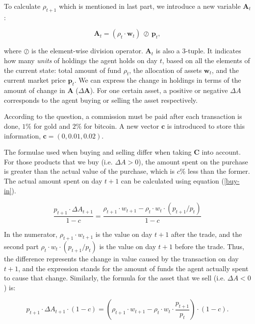 \documentclass{mcmthesis}
\begin{document}
To calculate $\rho _{t+1}$ which is mentioned in last part,
we introduce a new variable $\pmb{A}_t$:

\begin{equation}
  \pmb{A}_t = (\rho _t \cdot \pmb{w}_t) \, \oslash \, \pmb{p}_t ,
\end{equation}

where $\oslash$ is the element-wise division operator.
$\pmb{A}_t$ is also a 3-tuple.
It indicates how many \textit{units} of holdings the agent holds on day $t$,
based on all the elements of the current state:
total amount of fund $\rho_t$, the allocation of assets $\pmb{w}_t$,
and the current market price $\pmb{p}_t$.
We can express the change in holdings in terms of the amount of change in $\pmb{A}$ ($\Delta \pmb{A}$).
For one certain asset,
a positive or negative $\Delta A$ corresponds to the agent buying or selling the asset respectively.

According to the question, a commission must be paid after each transaction is done,
$1\%$ for gold and $2\%$ for bitcoin.
A new vector $\pmb{c}$ is introduced to store this information,
$\pmb{c} = (0, 0.01, 0.02)$.

The formulae used when buying and selling differ when taking $\pmb{C}$ into account.
For those products that we buy (i.e. $\Delta A > 0$),
the amount spent on the purchase is greater than the actual value of the purchase,
which is $c\%$ less than the former.
The actual amount spent on day $t+1$ can be calculated using equation (\ref{buy-in}).

\begin{equation}
  \frac{p_{t+1} \cdot \Delta A_{t+1}}{1-c}
  = \frac{\rho _{t+1} \cdot w_{t+1} - \rho _t \cdot w_t \cdot (p_{t+1} / p_t)}{1-c}
  \label{buy-in}
\end{equation}

In the numerator,
$\rho _{t+1} \cdot w_{t+1}$ is the value on day $t+1$ after the trade,
and the second part $\rho _t \cdot w_t \cdot (p_{t+1} / p_t)$
is the value on day $t+1$ before the trade.
Thus, the difference represents the change in value caused by the transaction on day $t+1$,
and the expression stands for the amount of funds the agent actually spent
to cause that change.
Similarly, the formula for the asset that we sell (i.e. $\Delta A < 0$) is:

\begin{equation}
  p_{t+1} \cdot \Delta A_{t+1} \cdot (1 - c)
  = (\rho _{t+1} \cdot w_{t+1} - \rho _t \cdot w_t \cdot \frac{p_{t+1}}{p_t}) \cdot (1-c).
\end{equation}
\end{document}
